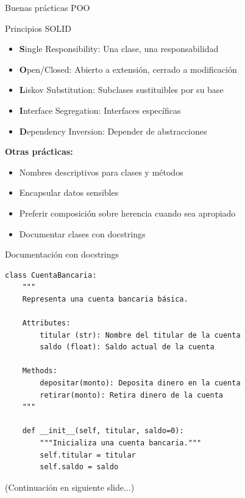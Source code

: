 \documentclass{beamer}
\begin{document}
\begin{frame}{Buenas prácticas POO \faCheckDouble}
\begin{conceptbox}{Principios SOLID}
\small
\begin{itemize}
    \item[\faCheck] \textbf{S}ingle Responsibility: Una clase, una responsabilidad
    \item[\faCheck] \textbf{O}pen/Closed: Abierto a extensión, cerrado a modificación
    \item[\faCheck] \textbf{L}iskov Substitution: Subclases sustituibles por su base
    \item[\faCheck] \textbf{I}nterface Segregation: Interfaces específicas
    \item[\faCheck] \textbf{D}ependency Inversion: Depender de abstracciones
\end{itemize}
\end{conceptbox}

\vspace{0.2cm}
\textbf{Otras prácticas:}
\small
\begin{itemize}
    \item[\faCheck] Nombres descriptivos para clases y métodos
    \item[\faCheck] Encapsular datos sensibles
    \item[\faCheck] Preferir composición sobre herencia cuando sea apropiado
    \item[\faCheck] Documentar clases con docstrings
\end{itemize}
\end{frame}

\begin{frame}[fragile]{Documentación con docstrings \faFileAlt}
\begin{lstlisting}
class CuentaBancaria:
    """
    Representa una cuenta bancaria básica.
    
    Attributes:
        titular (str): Nombre del titular de la cuenta
        saldo (float): Saldo actual de la cuenta
    
    Methods:
        depositar(monto): Deposita dinero en la cuenta
        retirar(monto): Retira dinero de la cuenta
    """
    
    def __init__(self, titular, saldo=0):
        """Inicializa una cuenta bancaria."""
        self.titular = titular
        self.saldo = saldo
\end{lstlisting}

\small(Continuación en siguiente slide...)
\end{frame}
\end{document}
